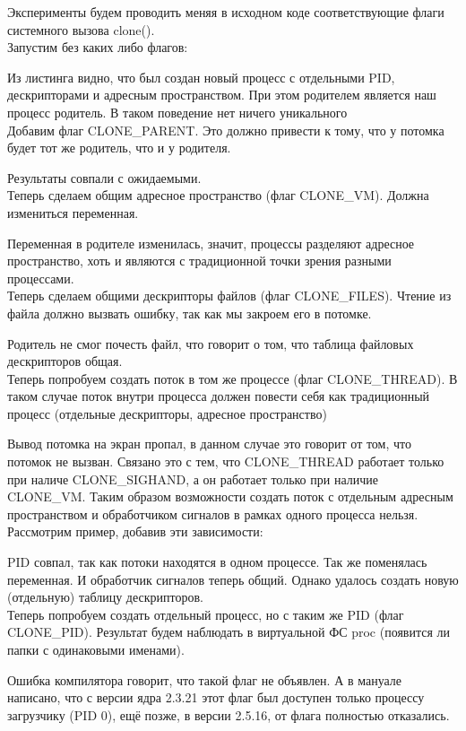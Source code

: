 \documentclass[a4paper]{article}
\begin{document}
	
	Эксперименты будем проводить меняя в исходном коде соответствующие флаги системного вызова clone().\\		Запустим без каких либо флагов:
	
	Из листинга видно, что был создан новый процесс с отдельными PID, дескрипторами и адресным пространством. При этом родителем является наш процесс родитель. В таком поведение нет ничего уникального\\
	
	Добавим флаг CLONE\_PARENT. Это должно привести к тому, что у потомка будет тот же родитель, что и у родителя.
	
	Результаты совпали с ожидаемыми.\\

	Теперь сделаем общим адресное пространство (флаг CLONE\_VM). Должна измениться переменная.	
	
	Переменная в родителе изменилась, значит, процессы разделяют адресное пространство, хоть и являются с традиционной точки зрения разными процессами.\\

	Теперь сделаем общими дескрипторы файлов (флаг CLONE\_FILES). Чтение из файла должно вызвать ошибку, так как мы закроем его в потомке.
	
	Родитель не смог почесть файл, что говорит о том, что таблица файловых дескрипторов общая.\\

	Теперь попробуем создать поток в том же процессе (флаг CLONE\_THREAD). В таком случае поток внутри процесса должен повести себя как традиционный процесс (отдельные дескрипторы, адресное пространство)
	
	Вывод потомка на экран пропал, в данном случае это говорит от том, что потомок не вызван. Связано это с тем, что CLONE\_THREAD работает только при наличе CLONE\_SIGHAND, а он работает только при наличие CLONE\_VM. Таким образом возможности создать поток с отдельным адресным пространством и обработчиком сигналов в рамках одного процесса нельзя. Рассмотрим пример, добавив эти зависимости:
	
	PID совпал, так как потоки находятся в одном процессе. Так же поменялась переменная. И обработчик сигналов теперь общий. Однако удалось создать новую (отдельную) таблицу дескрипторов.\\

	Теперь попробуем создать отдельный процесс, но с таким же PID (флаг CLONE\_PID). Результат будем наблюдать в виртуальной ФС proc (появится ли папки с одинаковыми именами).
	
	Ошибка компилятора говорит, что такой флаг не объявлен. А в мануале написано, что с версии ядра 2.3.21 этот флаг был доступен только процессу загрузчику (PID 0), ещё позже, в версии 2.5.16, от флага полностью отказались.
	
\end{document}
